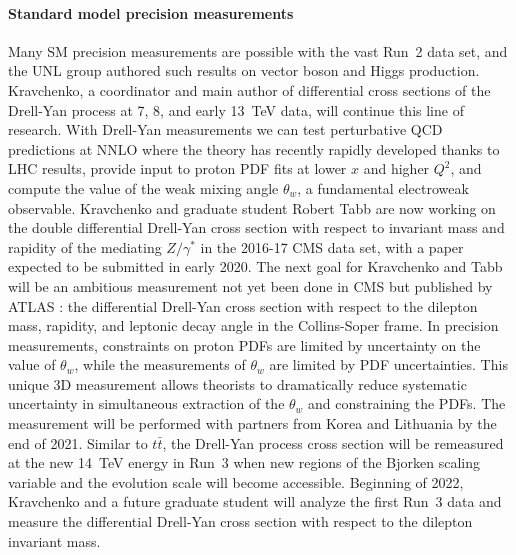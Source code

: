 \paragraph{Standard model precision measurements}
Many SM precision measurements are possible with the vast Run~2 data set, and the UNL group authored such results on vector boson and Higgs production. Kravchenko, a coordinator and main author of differential cross sections of the Drell-Yan process at 7, 8, and early 13~TeV data, will continue this line of research. With Drell-Yan measurements we can test perturbative QCD predictions at NNLO where the theory has recently rapidly developed thanks to LHC results, provide input to proton PDF fits at lower $x$ and higher $Q^2$, and compute the value of the weak mixing angle $\theta_w$, a fundamental electroweak observable. 
Kravchenko and graduate student Robert Tabb are now working on the double differential Drell-Yan cross section with respect to invariant mass and rapidity of the mediating $Z/\gamma^*$ in the 2016-17 CMS data set, with a paper expected to be submitted in early 2020. The next goal for Kravchenko and Tabb will be an ambitious measurement not yet been done in CMS but published by ATLAS \cite{bib:ATLAS-3D}: the differential Drell-Yan cross section with respect to the dilepton mass, rapidity, and leptonic decay angle in the Collins-Soper frame. In precision measurements, constraints on proton PDFs are limited by uncertainty on the value of $\theta_w$, while the measurements of $\theta_w$ are limited by PDF uncertainties. This unique 3D measurement allows theorists to dramatically reduce systematic uncertainty in simultaneous extraction of the $\theta_w$ and constraining the PDFs. The measurement will be performed with partners from Korea and Lithuania by the end of 2021. 
%
%
Similar to $t\bar{t}$, the Drell-Yan process cross section will be remeasured at the new 14~TeV energy in Run~3 when new regions of the Bjorken scaling variable and the evolution scale will become accessible. Beginning of 2022, Kravchenko and a future graduate student will analyze the first Run~3 data and measure the 
differential Drell-Yan cross section with respect to the dilepton invariant mass.

